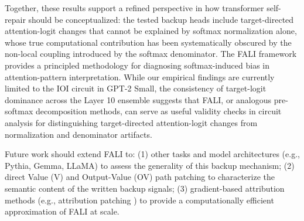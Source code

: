 \documentclass[10pt]{article} %
\begin{document}
Together, these results support a refined perspective in how transformer
self-repair should be conceptualized: the tested backup heads include target-directed
attention-logit changes that cannot be explained by softmax normalization alone,
whose true computational contribution has been systematically
obscured by the non-local coupling introduced by the softmax denominator. The FALI framework provides a principled methodology for diagnosing softmax-induced bias in attention-pattern interpretation. While our empirical findings are currently limited to the IOI circuit in GPT-2 Small, the consistency of target-logit dominance across the Layer 10 ensemble suggests that FALI, or analogous pre-softmax decomposition methods, can serve as useful validity checks in circuit analysis for distinguishing target-directed attention-logit changes from normalization and denominator artifacts.

Future work should extend FALI to: (1) other tasks and model architectures
(e.g., Pythia, Gemma, LLaMA) to assess the generality of this backup mechanism;
(2) direct Value (V) and Output-Value (OV) path patching to characterize the
semantic content of the written backup signals; (3) gradient-based attribution
methods (e.g., attribution patching \citep{nanda2023attribution}) to provide a
computationally efficient approximation of FALI at scale.



\setlength{\bibsep}{1.5pt plus 0.5pt minus 0.5pt}
{\small


}
\end{document}
